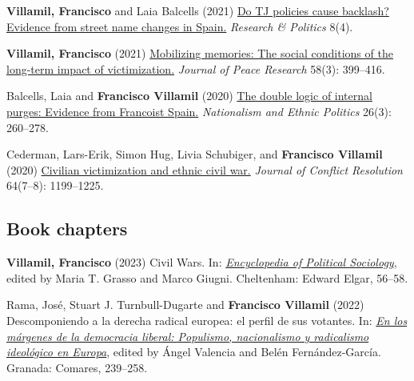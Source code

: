 \documentclass[a4paper, 12pt]{article}
\renewcommand\labelitemi{\textbf{--}}
\begin{document}
\begin{etaremune}[leftmargin=12pt, itemsep=0pt]
\item \textbf{Villamil, Francisco} and Laia Balcells (2021) \href{https://journals.sagepub.com/doi/full/10.1177/20531680211058550}{Do TJ policies cause backlash? Evidence from street name changes in Spain.} \textit{Research \& Politics} 8(4).
\item \textbf{Villamil, Francisco} (2021) \href{https://doi.org/10.1177/0022343320912816}{Mobilizing memories: The social conditions of the long-term impact of victimization.} \textit{Journal of Peace Research} 58(3): 399--416.
\item Balcells, Laia and \textbf{Francisco Villamil} (2020) \href{https://doi.org/10.1080/13537113.2020.1795451}{The double logic of internal purges: Evidence from Francoist Spain.} \textit{Nationalism and Ethnic Politics} 26(3): 260--278.
\item Cederman, Lars-Erik, Simon Hug, Livia Schubiger, and \textbf{Francisco Villamil} (2020) \href{https://doi.org/10.1177/0022002719898873}{Civilian victimization and ethnic civil war.} \textit{Journal of Conflict Resolution} 64(7--8): 1199--1225.
\end{etaremune}

\subsection*{Book chapters}

\begin{etaremune}[leftmargin=12pt, itemsep=0pt]
\item \textbf{Villamil, Francisco} (2023) Civil Wars. In: \href{https://www.e-elgar.com/shop/gbp/elgar-encyclopedia-of-political-sociology-9781803921228.html}{\textit{Encyclopedia of Political Sociology}}, edited by Maria T. Grasso and Marco Giugni. Cheltenham: Edward Elgar, 56--58. %
\item Rama, José, Stuart J. Turnbull-Dugarte and \textbf{Francisco Villamil} (2022) Descomponiendo a la derecha radical europea: el perfil de sus votantes. In: \href{https://www.comares.com/libro/en-los-margenes-de-la-democracia-liberal_143816/}{\textit{En los márgenes de la democracia liberal: Populismo, nacionalismo y radicalismo ideológico en Europa}}, edited by Ángel Valencia and Belén Fernández-García. Granada: Comares, 239--258. %
\end{etaremune}
\end{document}

